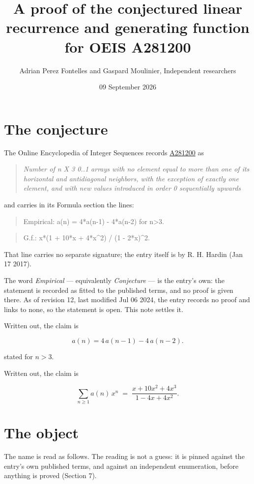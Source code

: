 \documentclass[11pt]{article}
\title{A proof of the conjectured linear recurrence and generating function for OEIS A281200}
\author{Adrian Perez Fontelles and Gaspard Moulinier, Independent researchers}
\date{09 September 2026}
\theoremstyle{definition}
\begin{document}
\maketitle
\section{The conjecture}

The Online Encyclopedia of Integer Sequences records \href{https://oeis.org/A281200}{A281200} as

\begin{quote}\itshape Number of n X 3 0..1 arrays with no element equal to more than one of its horizontal and antidiagonal neighbors, with the exception of exactly one element, and with new values introduced in order 0 sequentially upwards\end{quote}

and carries in its Formula section the lines:

\begin{quote}\ttfamily Empirical: a(n) = 4*a(n-1) - 4*a(n-2) for n>3.\end{quote}

\begin{quote}\ttfamily G.f.: x*(1 + 10*x + 4*x\textasciicircum{}2) / (1 - 2*x)\textasciicircum{}2.\end{quote}

That line carries no separate signature; the entry itself is by R. H. Hardin (Jan 17 2017).

The word {\itshape Empirical} --- equivalently {\itshape Conjecture} --- is the entry's own: the statement is recorded as fitted to the published terms, and no proof is given there. As of revision 12, last modified Jul 06 2024, the entry records no proof and links to none, so the statement is open. This note settles it.

Written out, the claim is

\[a(n) = 4\,a(n-1) - 4\,a(n-2).\]

stated for $n > 3$.

Written out, the claim is

\[\sum_{n \ge 1} a(n)\,x^n \;=\; \frac{x + 10x^{2} + 4x^{3}}{1 - 4x + 4x^{2}}.\]

\section{The object}

The name is read as follows. The reading is not a guess: it is pinned against the entry's own published terms, and against an independent enumeration, before anything is proved (Section 7).
\end{document}

